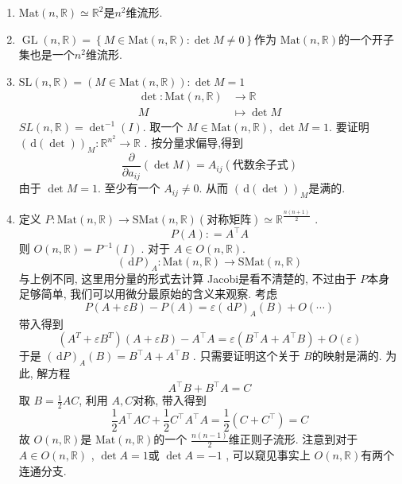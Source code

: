 \documentclass[../main.tex]{subfiles}
\begin{document}
\begin{example}{}{}
  \begin{enumerate}
    \item \(  \mathrm{Mat}\left( n,\mathbb{R}  \right)\simeq \mathbb{R} ^{2}   \)是\(  n^{2}  \)维流形.  
    \item \(  \operatorname{GL} \left( n,\mathbb{R}  \right)= \left\{ M\in \mathrm{Mat}\left( n,\mathbb{R}  \right):\det M\neq 0  \right\}   \)作为 \(  \mathrm{Mat}\left( n,\mathbb{R}  \right)   \)的一个开子集也是一个\(  n^{2}  \)维流形.    
    \item  \(  \mathrm{SL}\left( n,\mathbb{R}  \right)= \left( M\in \mathrm{Mat}\left( n,\mathbb{R}  \right)  \right):\det M= 1    \)   \[
    \begin{aligned}
    \det : \mathrm{Mat}\left( n,\mathbb{R}  \right)&\to \mathbb{R} \\ 
     M&\mapsto \det M  
    \end{aligned}
    \]  \(  SL  \left( n,\mathbb{R}  \right)= \det ^{-1} \left( I \right)  \). 取一个 \(  M \in \mathrm{Mat}\left( n,\mathbb{R}  \right)   \), \(  \det M= 1  \). 要证明 \(  \left( \,\mathrm{d} \left( \det  \right)  \right)_{M}: \mathbb{R} ^{n^{2}}\to \mathbb{R}    \)   . 按分量求偏导,得到 \[
    \frac{\partial }{\partial a_{ij}} \left( \det M \right)=  A_{ij}(\text{代数余子式})  
    \]由于 \(  \det M= 1  \).  至少有一个 \(  A_{ij}\neq 0  \). 从而  \(  \left( \,\mathrm{d} \left( \det  \right)  \right)_{M}   \)是满的. 
  \item 定义 \(  P: \mathrm{Mat}\left( n,\mathbb{R}  \right)\to  \mathrm{SMat}\left( n,\mathbb{R}  \right)(\text{对称矩阵}) \simeq \mathbb{R} ^{\frac{n\left( n+ 1 \right)  }{2 } }   \) .  \[
  P\left( A \right): = A^{\top}A 
  \]则 \(  O\left( n,\mathbb{R}  \right)= P^{-1} \left( I \right)   \) . 对于 \(  A \in O\left( n,\mathbb{R}  \right)   \). \[
  \left( \,\mathrm{d} P \right)_{A}: \mathrm{Mat}\left( n,\mathbb{R}  \right)\to \mathrm{SMat}\left( n,\mathbb{R}  \right)   
  \]与上例不同, 这里用分量的形式去计算 Jacobi是看不清楚的, 不过由于 \(  P  \)本身足够简单, 我们可以用微分最原始的含义来观察. 考虑  \[
  P\left( A+  \varepsilon B \right)-P\left( A \right)=  \varepsilon \left( \,\mathrm{d} P \right)_{A}\left( B \right)+ O\left(  \cdots   \right)     
  \]带入得到 \[
  \left( A^{T}+  \varepsilon B^{T} \right)\left( A+  \varepsilon B \right)-A^{\top}A=    \varepsilon \left(B^{\top}A+ A^{\top}B \right)+ O\left(  \varepsilon  \right)  
  \]于是 \(  \left( \,\mathrm{d} P \right)_{A}   \left( B \right)= B ^{\top}A+ A^{\top}B\) . 只需要证明这个关于 \(  B  \)的映射是满的. 为此, 解方程 \[
  A^{\top}B+ B^{\top}A= C
  \] 取 \(  B = \frac{1}{2}AC  \), 利用 \(  A,C  \)对称,   带入得到 \[
  \frac{1}{2}A^{\top}AC+ \frac{1}{2}C^{\top}A^{\top}A= \frac{1}{2}\left( C+ C^{\top} \right)= C 
  \]  
  故 \(  O\left( n,\mathbb{R}  \right)   \)是 \(  \mathrm{Mat}\left( n,\mathbb{R}  \right)   \)的一个 \(  \frac{n\left( n-1 \right)  }{2 }   \)维正则子流形. 注意到对于 \(  A \in O\left( n,\mathbb{R}  \right)   \) , \(  \det A= 1  \)或 \(  \det A= -1  \) , 可以窥见事实上 \(  O\left( n,\mathbb{R}  \right)   \)有两个连通分支.  
  \end{enumerate}
  
\end{example}
\end{document}
